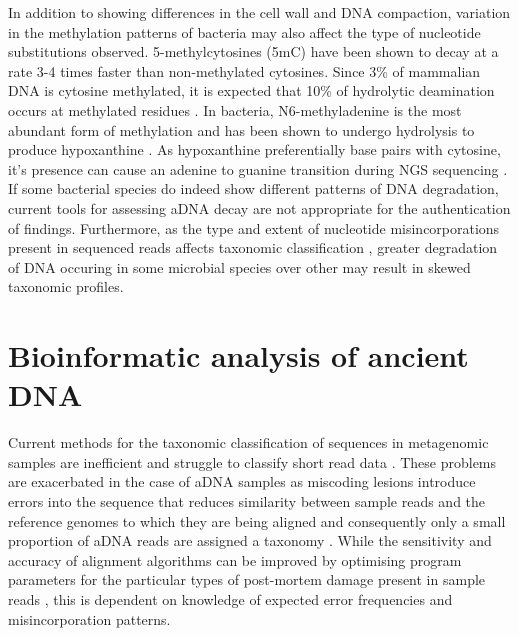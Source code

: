 \documentclass[12pt, a4paper]{article}
\begin{document}
In addition to showing differences in the cell wall and DNA compaction, variation in the methylation patterns of bacteria may also affect the type of nucleotide substitutions observed. 
5-methylcytosines (5mC) have been shown to decay at a rate 3-4 times faster than non-methylated cytosines. Since 3\% of mammalian DNA is cytosine methylated, it is expected that 10\% of hydrolytic deamination occurs at methylated residues \cite{Lindahl:1993aa}. 
In bacteria, N6-methyladenine is the most abundant form of methylation and has been shown to undergo hydrolysis to produce hypoxanthine \cite{OBrown:2016aa}. 
As hypoxanthine preferentially base pairs with cytosine, it's presence can cause an adenine to guanine transition during NGS sequencing \cite{Stiller:2006aa}.
If some bacterial species do indeed show different patterns of DNA degradation, current tools for assessing aDNA decay are not appropriate for the authentication of findings. 
Furthermore, as the type and extent of nucleotide misincorporations present in sequenced reads affects taxonomic classification \cite{Kircher:2012aa}, greater degradation of DNA occuring in some microbial species over other may result in skewed taxonomic profiles.  
\clearpage

\section*{Bioinformatic analysis of ancient DNA}\label{sec:bioinformatics}
Current methods for the taxonomic classification of sequences in metagenomic samples are inefficient and struggle to classify short read data \cite{Segata:2012aa}. 
These problems are exacerbated in the case of aDNA samples as miscoding lesions introduce errors into the sequence that reduces similarity between sample reads and the reference genomes to which they are being aligned \cite{Schubert:2012aa} and consequently only a small proportion of aDNA reads are assigned a taxonomy \cite{Fosso:2017aa}.
While the sensitivity and accuracy of alignment algorithms can be improved by optimising program parameters for the particular types of post-mortem damage present in sample reads \cite{Schubert:2012aa}, this is dependent on knowledge of expected error frequencies and misincorporation patterns.
\end{document}

